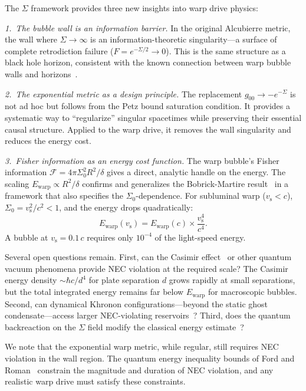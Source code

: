 \documentclass[prd,twocolumn,superscriptaddress,longbibliography]{revtex4-2}
\newcommand{\vs}{v_{\mathrm{s}}}
\newcommand{\Ewarp}{E_{\mathrm{warp}}}
\newcommand{\Fisher}{\mathcal{F}}
\begin{document}
The $\Sigma$ framework provides three new insights into warp drive physics:

\textit{1.\ The bubble wall is an information barrier.}  In the
original Alcubierre metric, the wall where $\Sigma \to \infty$ is
an information-theoretic singularity---a surface of complete
retrodiction failure ($F = e^{-\Sigma/2} \to 0$).  This is the
same structure as a black hole horizon, consistent with the known
connection between warp bubble walls and
horizons~\cite{Hiscock1997,Finazzi2009}.

\textit{2.\ The exponential metric as a design principle.}  The
replacement $g_{00} \to -e^{-\Sigma}$ is not ad hoc but follows from
the Petz bound saturation condition.  It provides a systematic way to
``regularize'' singular spacetimes while preserving their essential
causal structure.  Applied to the warp drive, it removes the wall
singularity and reduces the energy cost.

\textit{3.\ Fisher information as an energy cost function.}  The
warp bubble's Fisher information $\Fisher = 4\pi\Sigma_0^2 R^2/\delta$
gives a direct, analytic handle on the energy.  The scaling
$\Ewarp \propto R^2/\delta$ confirms and generalizes the Bobrick-Martire
result~\cite{BobrickMartire2021} in a framework that also specifies
the $\Sigma_0$-dependence.  For subluminal warp ($\vs < c$),
$\Sigma_0 = \vs^2/c^2 < 1$, and the energy drops quadratically:
\begin{equation}
\Ewarp(\vs) = \Ewarp(c)\times\frac{\vs^4}{c^4}.
\label{eq:subluminal}
\end{equation}
A bubble at $\vs = 0.1\,c$ requires only $10^{-4}$ of the
light-speed energy.

Several open questions remain.  First, can the Casimir
effect~\cite{Casimir1948} or other quantum vacuum phenomena
provide NEC violation at the required scale?  The Casimir energy
density $\sim \hbar c/d^4$ for plate separation $d$ grows rapidly
at small separations, but the total integrated energy remains
far below $\Ewarp$ for macroscopic bubbles.  Second, can
dynamical Khronon configurations---beyond the static ghost
condensate---access larger NEC-violating
reservoirs~\cite{BS2025}?  Third, does the quantum
backreaction on the $\Sigma$ field modify the classical energy
estimate~\cite{FordRoman1996}?

We note that the exponential warp metric, while regular, still
requires NEC violation in the wall region.  The quantum energy
inequality bounds of Ford and Roman~\cite{FordRoman1996} constrain
the magnitude and duration of NEC violation, and any realistic warp
drive must satisfy these constraints.
\end{document}
